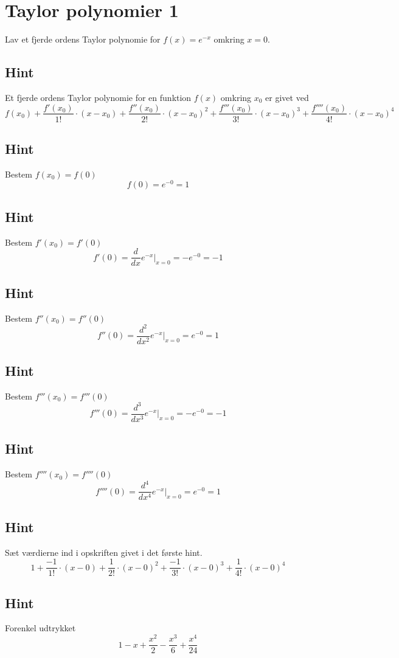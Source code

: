 \documentclass{article}
\newenvironment{exercise}[1]{\newpage\section{#1}}{}
\newcommand{\answerbox}[1]{\fbox{$#1$}}
\newcommand{\hint}{\subsection*{Hint}}
\begin{document}
\begin{exercise}{Taylor polynomier 1}

Lav et fjerde ordens Taylor polynomie for $f(x) = e^{-x}$
omkring $x = 0$.

\answerbox{1 - x + \frac{x^2}{2} - \frac{x^3}{6} + \frac{x^4}{24}}

\hint
Et fjerde ordens Taylor polynomie for en funktion $f(x)$
omkring $x_0$ er givet ved
\[
f(x_0) + \frac{f'(x_0)}{1!} \cdot (x - x_0) + \frac{f''(x_0)}{2!} \cdot (x - x_0)^2 + \frac{f'''(x_0)}{3!} \cdot (x - x_0)^3 + \frac{f''''(x_0)}{4!} \cdot (x - x_0)^4
\]

\hint
Bestem $f(x_0) = f(0)$
\[
f(0) = e^{-0} = 1
\]

\hint
Bestem $f'(x_0) = f'(0)$
\[
f'(0) = \frac{d}{dx} e^{-x} \Big|_{x = 0} = -e^{-0} = -1
\]

\hint
Bestem $f''(x_0) = f''(0)$
\[
f''(0) = \frac{d^2}{dx^2} e^{-x} \Big|_{x = 0} = e^{-0} = 1
\]

\hint
Bestem $f'''(x_0) = f'''(0)$
\[
f'''(0) = \frac{d^3}{dx^3} e^{-x} \Big|_{x = 0} = -e^{-0} = -1
\]

\hint
Bestem $f''''(x_0) = f''''(0)$
\[
f''''(0) = \frac{d^4}{dx^4} e^{-x} \Big|_{x = 0} = e^{-0} = 1
\]

\hint
Sæt værdierne ind i opskriften givet i det første hint.
\[
1 + \frac{-1}{1!} \cdot (x - 0) + \frac{1}{2!} \cdot (x - 0)^2 + \frac{-1}{3!} \cdot (x - 0)^3 + \frac{1}{4!} \cdot (x - 0)^4
\]

\hint
Forenkel udtrykket
\[
1 - x + \frac{x^2}{2} - \frac{x^3}{6} + \frac{x^4}{24}
\]

\end{exercise}
\end{document}
